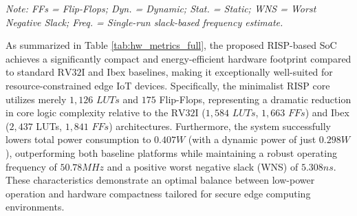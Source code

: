 \begin{table}[!t]
\centering
\caption{Hardware Resource and Performance Metrics}
\label{tab:hw_metrics_full}
\small
{}
\vspace{1pt}
\raggedright
\footnotesize\textit{Note: FFs = Flip-Flops; Dyn. = Dynamic; Stat. = Static; WNS = Worst Negative Slack; Freq. = Single-run slack-based frequency estimate.}
\end{table}

As summarized in Table \ref{tab:hw_metrics_full}, the proposed RISP-based SoC achieves a significantly compact and energy-efficient hardware footprint compared to standard $\text{RV}32\text{I}$ and Ibex baselines, making it exceptionally well-suited for resource-constrained edge IoT devices. Specifically, the minimalist RISP core utilizes merely $1,126$ $LUTs$ and $175$ Flip-Flops, representing a dramatic reduction in core logic complexity relative to the $\text{RV}32\text{I}$ ($1,584$ $LUTs$, $1,663$ $FFs$) and Ibex ($2,437$ LUTs, $1,841$ $FFs$) architectures. Furthermore, the system successfully lowers total power consumption to $0.407 W$ (with a dynamic power of just $0.298 W$), outperforming both baseline platforms while maintaining a robust operating frequency of $50.78 MHz$ and a positive worst negative slack (WNS) of $5.308 ns$. These characteristics demonstrate an optimal balance between low-power operation and hardware compactness tailored for secure edge computing environments.

